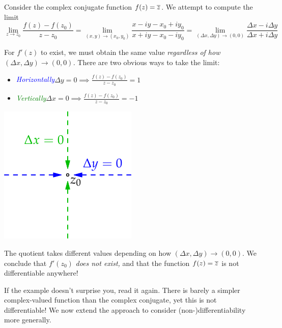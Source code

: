 \begin{example}{}{}
Consider the complex conjugate function $f(z)=\overline{z}$. We attempt to compute the limit
  \[\lim\limits_{z\to z_0}\frac{f(z)-f(z_0)}{z-z_0}=  \lim\limits_{(x,y)\to(x_0,y_0)} \frac{x-iy-x_0+iy_0}{x+iy-x_0-iy_0} = \lim\limits_{(\Delta x,\Delta y)\to (0,0)} \frac{\Delta x-i\Delta y}{\Delta x+i\Delta y}\]
  
  \begin{minipage}[t]{0.7\linewidth}\vspace{0pt}
  For $f'(z)$ to exist, we must obtain the same value \emph{regardless of how $(\Delta x,\Delta y)\to (0,0)$.} There are two obvious ways to take the limit:
  \begin{itemize}
  \item[]\normalfont\emph{\textcolor{blue}{Horizontally}}\quad $\displaystyle\Delta y=0\implies \frac{f(z)-f(z_0)}{z-z_0} =1$
  \item[]\normalfont\emph{\textcolor{Green}{Vertically}}\quad $\displaystyle\Delta x=0\implies \frac{f(z)-f(z_0)}{z-z_0} =-1$
  \end{itemize}
  \end{minipage}\begin{minipage}[t]{0.3\linewidth}\vspace{-5pt}
  \flushright\includegraphics{diff-cr}  
  \end{minipage}\par
  The quotient takes different values depending on how $(\Delta x,\Delta y)\to(0,0)$. We conclude that $f'(z_0)$ \emph{does not exist,} and that the function $f(z)=\overline{z}$ is not differentiable anywhere!
\end{example}

If the example doesn't surprise you, read it again. There is barely a simpler complex-valued function than the complex conjugate, yet this is not differentiable! We now extend the approach to consider (non-)differentiability more generally.\smallbreak

